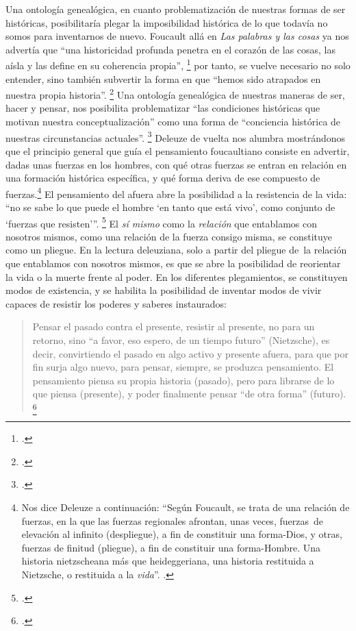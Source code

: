 Una ontología genealógica, en cuanto problematización de nuestras formas de ser históricas, posibilitaría plegar la imposibilidad histórica de lo que todavía no somos para inventarnos de nuevo. Foucault allá en \emph{Las palabras y las cosas} ya nos advertía que \enquote{una historicidad profunda penetra en el corazón de las cosas, las aísla y las define en su coherencia propia}, \footcite[][8]{@7079-FOUCAULT2005} por tanto, se vuelve necesario no solo entender, sino también subvertir la forma en que \enquote{hemos sido atrapados en nuestra propia historia}. \footcite[][244]{@7056-FOUCAULT2001} Una ontología genealógica de nuestras maneras de ser, hacer y pensar, nos posibilita problematizar \enquote{las condiciones históricas que motivan nuestra conceptualización} como una forma de \enquote{conciencia histórica de nuestras circunstancias actuales}. \footcite[][242]{@7056-FOUCAULT2001} Deleuze de vuelta nos alumbra mostrándonos que el principio general que guía el pensamiento foucaultiano consiste en advertir, dadas unas fuerzas en los hombres, con qué otras fuerzas se entran en relación en una formación histórica específica, y qué forma deriva de ese compuesto de fuerzas.\footnote{Nos dice Deleuze a continuación: \enquote{Según Foucault, se trata de una relación de fuerzas, en la que las fuerzas regionales afrontan, unas veces, fuerzas~de elevación al infinito (despliegue), a fin de constituir una forma-Dios, y otras, fuerzas de finitud (pliegue), a fin de constituir una forma-Hombre. Una historia nietzscheana más que heideggeriana, una historia restituida a Nietzsche, o restituida a la \emph{vida}}. \cite[][166]{@7053-DELEUZE2008}.} El pensamiento del afuera abre la posibilidad a la resistencia de la vida: \enquote{no se sabe lo que puede el hombre \enquote{en tanto que está vivo}, como conjunto de \enquote{fuerzas que resisten}}. \footcite[][122]{@7053-DELEUZE2008} El \emph{sí mismo} como la \emph{relación} que entablamos con nosotros mismos, como una relación de la fuerza consigo misma, se constituye como un pliegue. En la lectura deleuziana, solo a partir del pliegue de~la relación que entablamos con nosotros mismos, es que se abre la posibilidad de reorientar la vida o la muerte frente al poder. En los diferentes plegamientos, se constituyen modos de existencia, y se habilita la posibilidad de inventar modos de vivir capaces de resistir los poderes y saberes instaurados:

\begin{quote}
Pensar el pasado contra el presente, resistir al presente, no para un retorno, sino \enquote{a favor, eso espero, de un tiempo futuro} (Nietzsche), es decir, convirtiendo el pasado en algo activo y presente afuera, para que por fin surja algo nuevo, para pensar, siempre, se produzca pensamiento. El pensamiento piensa su propia historia (pasado), pero para librarse de lo que piensa (presente), y poder finalmente pensar \enquote{de otra forma} (futuro). \footcite[][154-155]{@7053-DELEUZE2008}
\end{quote}

